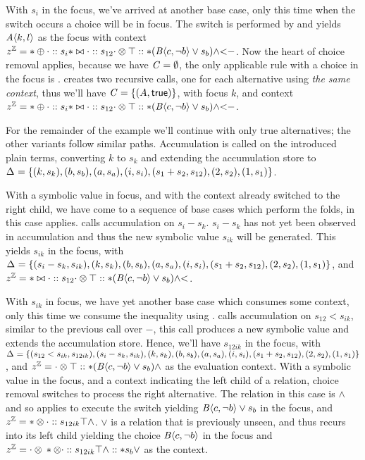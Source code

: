 With $s_{i}$ in the focus, we've arrived at another base case, only this time
when the switch occurs a choice will be in focus. The switch is performed by
\crArithL{} and yields $\chc[A]{k, l}$ as the focus with context $\zipper =
\inArithR*{s_{i}}{\inInEqR*{s_{12}}{\inBoolL*{\inRoot{}}{(\chc[B]{c,\neg b}
      \vee{} s_{b})}{\wedge}}{<}}{-}$. Now the heart of choice removal applies,
because we have $\configuration{} = \emptyset$, the only applicable rule with a
choice in the focus is \crChc. \crChc{} creates two recursive calls, one for
each alternative using \emph{the same context}, thus we'll have $\configuration=
\set{(A,\true)}$, with focus $k$, and context $\zipper =
\inArithR*{s_{i}}{\inInEqR*{s_{12}}{\inBoolL*{\inRoot{}}{(\chc[B]{c,\neg b}
      \vee{} s_{b})}{\wedge}}{<}}{-}$.

For the remainder of the example we'll continue with only true alternatives; the
other variants follow similar paths. Accumulation is called on the introduced
plain terms, converting $k$ to $s_{k}$ and extending the accumulation store to
\newline$\aStore{}=\set{(k,s_{k}),(b, s_{b}),(a,s_{a}),(i, s_{i}),(s_{1} +
  s_{2}, s_{12}), (2,s_{2}), (1,s_{1})}$.

With a symbolic value in focus, and with the context already switched to the
right child, we have come to a sequence of base cases which perform the folds,
in this case \crArithR{} applies. \crArithR{} calls accumulation on $s_{i} -
s_{k}$. $s_{i} - s_{k}$ has not yet been observed in accumulation and thus the
new symbolic value $s_{ik}$ will be generated. This yields $s_{ik}$ in the
focus, with $\aStore{}=\set{(s_{i} - s_{k}, s_{ik}), (k,s_{k}),(b,
  s_{b}),(a,s_{a}),(i, s_{i}),(s_{1} + s_{2}, s_{12}), (2,s_{2}), (1,s_{1})}$,
and $\zipper = \inInEqR*{s_{12}}{\inBoolL*{\inRoot{}}{(\chc[B]{c,\neg b} \vee{}
    s_{b})}{\wedge}}{<}$.

With $s_{ik}$ in focus, we have yet another base case which consumes some
context, only this time we consume the inequality using \crInEqR{}. \crInEqR{}
calls accumulation on $s_{12} < s_{ik}$, similar to the previous call over $-$,
this call produces a new symbolic value and extends the accumulation store.
Hence, we'll have $s_{12ik}$ in the focus, with $\aStore{}=\set{(s_{12} <
  s_{ik}, s_{12ik}),(s_{i} - s_{k}, s_{ik}), (k,s_{k}),(b, s_{b}),(a,s_{a}),(i,
  s_{i}),(s_{1} + s_{2}, s_{12}), (2,s_{2}), (1,s_{1})}$, and $\zipper =
\inBoolL*{\inRoot{}}{(\chc[B]{c,\neg b} \vee{} s_{b})}{\wedge}$ as the
evaluation context. With a symbolic value in the focus, and a context indicating
the left child of a relation, choice removal switches to process the right
alternative. The relation in this case is $\wedge$ and so \crBoolL{} applies to
execute the switch yielding $\chc[B]{c,\neg b} \vee{} s_{b}$ in the focus, and
$\zipper = \inBoolR*{s_{12ik}}{\inRoot{}}{\wedge}$. $\vee$ is a relation that is
previously unseen, and thus \crBool{} recurs into its left child yielding the
choice $\chc[B]{c, \neg b}$ in the focus and \newline$\zipper =
\inBoolL*{\inBoolR*{s_{12ik}}{\inRoot{}}{\wedge}}{s_{b}}{\vee}$ as the context.

